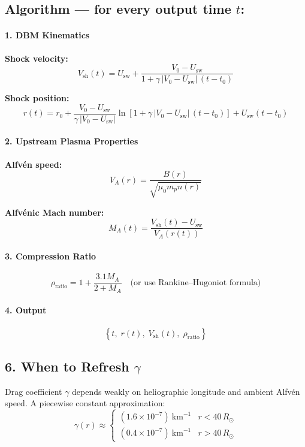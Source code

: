 \subsection*{Algorithm — for every output time $t$:}

\paragraph{1. DBM Kinematics}
\textbf{Shock velocity:}
\[
V_{\mathrm{sh}}(t) = U_{\mathrm{sw}} + \frac{V_0 - U_{\mathrm{sw}}}{1 + \gamma \, |V_0 - U_{\mathrm{sw}}| \, (t - t_0)}
\]

\textbf{Shock position:}
\[
r(t) = r_0 + \frac{V_0 - U_{\mathrm{sw}}}{\gamma \, |V_0 - U_{\mathrm{sw}}|} \ln\left[1 + \gamma \, |V_0 - U_{\mathrm{sw}}| \, (t - t_0)\right] + U_{\mathrm{sw}} (t - t_0)
\]

\paragraph{2. Upstream Plasma Properties}
\textbf{Alfvén speed:}
\[
V_A(r) = \frac{B(r)}{\sqrt{\mu_0 m_p n(r)}}
\]

\textbf{Alfvénic Mach number:}
\[
M_A(t) = \frac{V_{\mathrm{sh}}(t) - U_{\mathrm{sw}}}{V_A(r(t))}
\]

\paragraph{3. Compression Ratio}
\[
\rho_{\mathrm{ratio}} = 1 + \frac{3.1 M_A}{2 + M_A}
\quad \text{(or use Rankine–Hugoniot formula)}
\]

\paragraph{4. Output}
\[
\left\{ t,\; r(t),\; V_{\mathrm{sh}}(t),\; \rho_{\mathrm{ratio}} \right\}
\]


\subsection*{6. When to Refresh $\gamma$}

Drag coefficient $\gamma$ depends weakly on heliographic longitude and ambient Alfv\'{e}n speed. A piecewise constant approximation:
\[
\gamma(r) \approx
\begin{cases}
(1.6\times10^{-7})\ \text{km}^{-1} & r < 40\,R_\odot \\
(0.4\times10^{-7})\ \text{km}^{-1} & r > 40\,R_\odot
\end{cases}
\]

